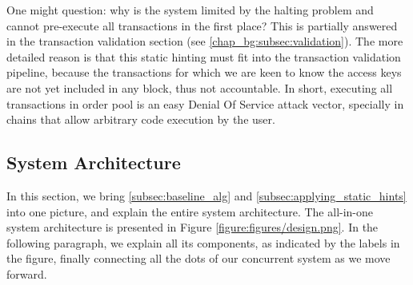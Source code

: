 \begin{remark}
	One might question: why is the system limited by the halting problem and cannot pre-execute all transactions in the first
	place? This is partially answered in the transaction validation section (see
	\ref{chap_bg:subsec:validation}). The more detailed reason is that this static hinting must fit
	into the transaction validation pipeline, because the transactions for which we are keen to know
	the access keys are not yet included in any block, thus not accountable. In short, executing all
	transactions in order pool is an easy Denial Of Service attack vector, specially in chains that
	allow arbitrary code execution by the user.
\end{remark}

\subsection{System Architecture}

In this section, we bring \ref{subsec:baseline_alg} and \ref{subsec:applying_static_hints} into one
picture, and explain the entire system architecture. The all-in-one system architecture is presented
in Figure \ref{figure:figures/design.png}. In the following paragraph, we explain all its
components, as indicated by the labels in the figure, finally connecting all the dots of our
concurrent system as we move forward.



